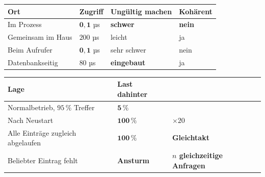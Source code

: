 \begin{merksatz}
\begin{center}
{\small
\renewcommand{\arraystretch}{1.5}
\begin{tabular}{@{}P{2.6cm}P{2.2cm}P{2.2cm}P{1.8cm}@{}}
\toprule
\textbf{Ort} & \textbf{Zugriff} & \textbf{Ungültig machen} & \textbf{Kohärent}\\
\midrule
Im Prozess & $\mathbf{0{,}1}$ µs & \textcolor{akzent}{\textbf{schwer}} & \textcolor{akzent}{\textbf{nein}}\\
Gemeinsam im Haus & $200$ µs & \textcolor{gruen}{leicht} & \textcolor{gruen}{ja}\\
Beim Aufrufer & $\mathbf{0{,}1}$ µs & \textcolor{akzent}{sehr schwer} & \textcolor{akzent}{nein}\\
Datenbankseitig & $80$ µs & \textcolor{gruen}{\textbf{eingebaut}} & \textcolor{gruen}{ja}\\
\bottomrule
\end{tabular}}
\end{center}

\begin{center}
\begin{minipage}{0.88\textwidth}
\end{minipage}
\end{center}

\begin{center}
\end{center}

\begin{warnung}
\begin{center}
{\small
\renewcommand{\arraystretch}{1.45}
\begin{tabular}{@{}P{3.0cm}P{2.2cm}P{2.6cm}@{}}
\toprule
\textbf{Lage} & \textbf{Last dahinter} & \\
\midrule
Normalbetrieb, $95\,\%$ Treffer & $\mathbf{5\,\%}$ & \\
Nach Neustart & $\mathbf{100\,\%}$ & \textcolor{akzent}{$\times20$}\\
Alle Einträge zugleich abgelaufen & \textcolor{akzent}{$\mathbf{100\,\%}$} & \textcolor{akzent}{\textbf{Gleichtakt}}\\
Beliebter Eintrag fehlt & \textcolor{akzent}{\textbf{Ansturm}} & \textcolor{akzent}{\textbf{$n$ gleichzeitige Anfragen}}\\
\bottomrule
\end{tabular}}
\end{center}


\end{warnung}
\end{merksatz}
